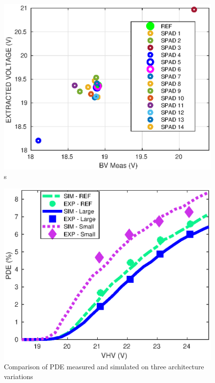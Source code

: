 \documentclass[10pt,a4paper,twocolumn]{article}
\begin{document}
\begin{figure}[h]
\caption{s}
\centering
\includegraphics[scale=0.65]{../pictures/000_McIntyre_Bench_GR5_graphs_BV.eps}
\end{figure}


\begin{figure}[hbtp]
\caption{Comparison of PDE measured and simulated on three architecture variations}
\centering
\includegraphics[scale=0.69]{../pictures/000_McIntyre_Bench_GR5_graphs.eps}
\end{figure}




\end{document}
